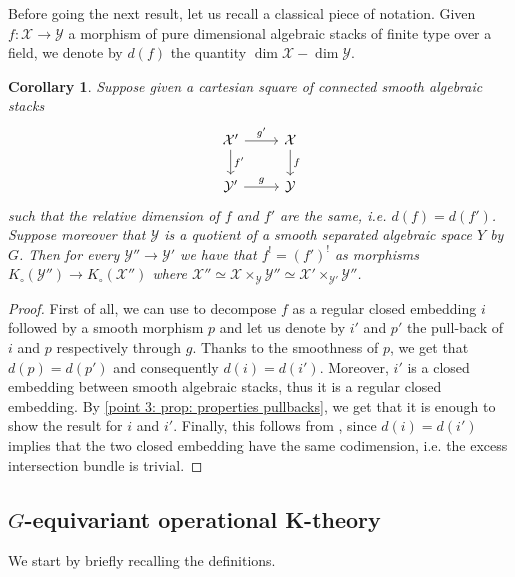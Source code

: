 \documentclass[12pt]{amsart}
\newcommand{\cX}{\mathcal{X}}
\newcommand{\cY}{\mathcal{Y}}
\newcommand{\Kgroup}{K_{\circ}}
\newtheorem{Cor}[theorem]{Corollary}
\theoremstyle{definition}
\begin{document}
Before going the next result, let us recall a classical piece of notation. Given $f:\cX \rightarrow \cY$ a morphism of pure dimensional algebraic stacks of finite type over a field, we denote by $d(f)$ the quantity $\dim \cX - \dim \cY$.
\begin{Cor}\label{cor:restriction of Gysin}
    Suppose given a cartesian square of connected smooth algebraic stacks 
    \[
    \begin{tikzcd}
        \cX'\arrow[r,"g'"]\arrow[d,"f'"] & \cX\arrow[d,"f"]\\
        \cY'\arrow[r,"g"] & \cY
    \end{tikzcd}
    \]
    such that the relative dimension of $f$ and $f'$ are the same, i.e. $d(f)=d(f')$. Suppose moreover that $\cY$ is a quotient of a smooth separated algebraic space $Y$ by $G$. Then for every $\cY''\rightarrow\cY'$ we have that $f^!=(f')^!$ as morphisms $\Kgroup(\cY'') \rightarrow \Kgroup(\cX'')$ where $\cX''\simeq \cX\times_{\cY} \cY'' \simeq \cX' \times_{\cY'} \cY''$.
\end{Cor}

\begin{proof}
 First of all, we can use  to decompose $f$ as a regular closed embedding $i$ followed by a smooth morphism $p$ and let us denote by $i'$ and $p'$ the pull-back of $i$ and $p$ respectively through $g$. Thanks to the smoothness of $p$, we get that $d(p)=d
 (p')$ and consequently $d(i)=d(i')$. Moreover, $i'$ is a closed embedding between smooth algebraic stacks, thus it is a regular closed embedding. By \eqref{point 3: prop: properties pullbacks}, we get that it is enough to show the result for $i$ and $i'$. Finally, this follows from , since $d(i)=d(i')$ implies that the two closed embedding have the same codimension, i.e. the excess intersection bundle is trivial.
\end{proof}

\subsection{$G$-equivariant operational K-theory}\label{sub:operational-K-theory}
We start by briefly recalling the definitions.
\end{document}
